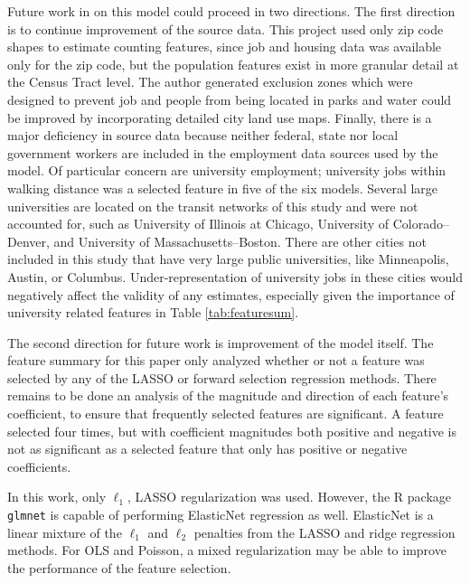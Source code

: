 \documentclass[11pt]{report}
\begin{document}
Future work in on this model could proceed in two directions. The first direction is to continue improvement of the source data. This project used only zip code shapes to estimate counting features, since job and housing data was available only for the zip code, but the population features exist in more granular detail at the Census Tract level. The author generated exclusion zones which were designed to prevent job and people from being located in parks and water could be improved by incorporating detailed city land use maps. Finally, there is a major deficiency in source data because neither federal, state nor local government workers are included in the employment data sources used by the model. Of particular concern are university employment; university jobs within walking distance was a selected feature in five of the six models. Several large universities are located on the transit networks of this study and were not accounted for, such as University of Illinois at Chicago, University of Colorado--Denver, and University of Massachusetts--Boston. There are other cities not included in this study that have very large public universities, like Minneapolis, Austin, or Columbus. Under-representation of university jobs in these cities would negatively affect the validity of any estimates, especially given the importance of university related features in Table \ref{tab:featuresum}.

The second direction for future work is improvement of the model itself. The feature summary for this paper only analyzed whether or not a feature was selected by any of the LASSO or forward selection regression methods. There remains to be done an analysis of the magnitude and direction of each feature's coefficient, to ensure that frequently selected features are significant. A feature selected four times, but with coefficient magnitudes both positive and negative is not as significant as a selected feature that only has positive or negative coefficients. 

In this work, only $\ell_1$, LASSO regularization was used. However, the R package \texttt{glmnet} is capable of performing ElasticNet regression as well. ElasticNet \cite{Zou2005} is a linear mixture of the $\ell_1$ and $\ell_2$ penalties from the LASSO and ridge regression methods. For OLS and Poisson, a mixed regularization may be able to improve the performance of the feature selection. 
\end{document}
